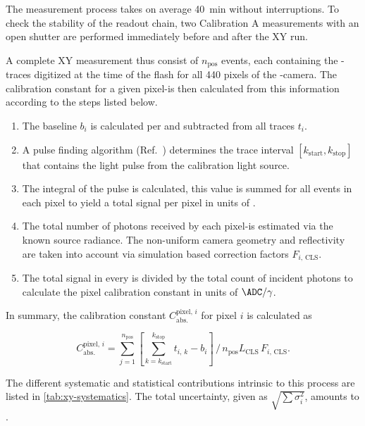 The measurement process takes on average \SI{40}{\minute} without interruptions.
To check the stability of the \FD \DAQ readout chain, two Calibration A 
measurements with an open \FD shutter are performed immediately before and after
the XY run.

A complete XY measurement thus consist of $n_\mathrm{pos}$ \FD events, each 
containing the \ADC-traces digitized at the time of the \CLS flash for all 440 
pixels of the \FD-camera. The calibration constant for a given pixel-\PMT is 
then calculated from this information according to the steps listed below.

\vspace{1cm}
\begin{enumerate}
	\item The baseline $b_i$ is calculated per \PMT and subtracted from all 
	traces $t_i$.
	\item A pulse finding algorithm 
	(Ref.~\cite[][Section 7.1.1]{schaferXYScannerVersatileMethod2023}) 
	determines the trace interval $[k_\mathrm{start}, k_\mathrm{stop}]$ that
	contains the light pulse from the calibration light source.
	\item The integral of the pulse is calculated, this value is summed for 
	all events in each pixel to yield a total signal per pixel in units of 
	\ADC.
	\item The total number of photons received by each pixel-\PMT is 
	estimated via the known source radiance. The non-uniform camera 
	geometry and reflectivity are taken into account via simulation based 
	correction factors $F_{i,\,\mathrm{CLS}}$.
	\item The total signal in every \PMT is divided by the total count of 
	incident photons to calculate the pixel calibration constant in units of
	$\ADC/\gamma$.
\end{enumerate}

In summary, the calibration constant $C^{\mathrm{pixel},\,i}_\mathrm{abs.}$ for 
pixel $i$ is calculated as 

\begin{equation}
	\label{eq:xy-scanner-calib-calculation}
	C^{\mathrm{pixel},\,i}_\mathrm{abs.} = \sum\limits_{j=1}^{n_\mathrm{pos}} \left[ \sum\limits_{k = k_\mathrm{start}}^{k_\mathrm{stop}} t_{i,\,k} - b_i \right]\,\bigg/\,n_\mathrm{pos}L_\mathrm{CLS}\,F_{i,\,\mathrm{CLS}}.
\end{equation}

The different systematic and statistical contributions intrinsic to this process
are listed in \cref{tab:xy-systematics}. The total uncertainty, given as 
$\sqrt{\sum\sigma_i^2}$, amounts to .

